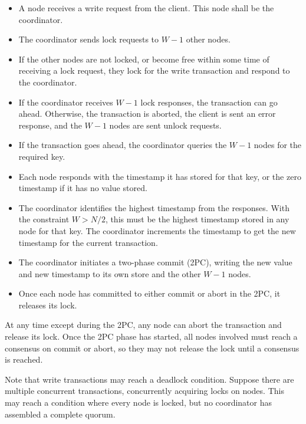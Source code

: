 \documentclass[12pt,a4paper,twoside,openany]{report}
\begin{document}
\begin{itemize}
\item
A node receives a write request from the client. This node shall be the coordinator.

\item
The coordinator sends lock requests to $W - 1$ other nodes.

\item
If the other nodes are not locked, or become free within some time of receiving a lock request, they lock for the write transaction and respond to the coordinator.

\item
If the coordinator receives $W - 1$ lock responses, the transaction can go ahead. Otherwise, the transaction is aborted, the client is sent an error response, and the $W - 1$ nodes are sent unlock requests.

\item
If the transaction goes ahead, the coordinator queries the $W - 1$ nodes for the required key.

\item
Each node responds with the timestamp it has stored for that key, or the zero timestamp if it has no value stored.

\item
The coordinator identifies the highest timestamp from the responses. With the constraint $W > N/2$, this must be the highest timestamp stored in any node for that key. The coordinator increments the timestamp to get the new timestamp for the current transaction.

\item
The coordinator initiates a two-phase commit (2PC), writing the new value and new timestamp to its own store and the other $W - 1$ nodes.

\item
Once each node has committed to either commit or abort in the 2PC, it releases its lock.

\end{itemize}

At any time except during the 2PC, any node can abort the transaction and release its lock. Once the 2PC phase has started, all nodes involved must reach a consensus on commit or abort, so they may not release the lock until a consensus is reached.

Note that write transactions may reach a deadlock condition. Suppose there are multiple concurrent transactions, concurrently acquiring locks on nodes. This may reach a condition where every node is locked, but no coordinator has assembled a complete quorum.
\end{document}
